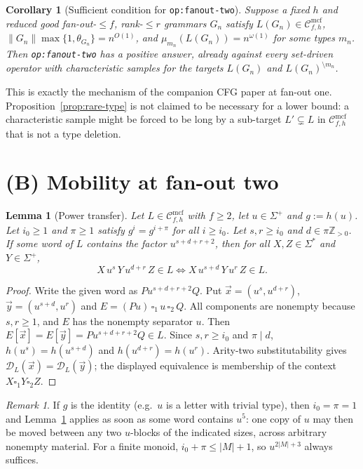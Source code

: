 \documentclass[11pt]{article}
\newtheorem{lemma}[theorem]{Lemma}
\newtheorem{corollary}[theorem]{Corollary}
\theoremstyle{definition}
\theoremstyle{remark}
\newtheorem{remark}[theorem]{Remark}
\newcommand{\Cmcf}[2]{\mathcal{C}^{\mathrm{mcf}}_{#1,#2}}
\newcommand{\D}{\mathcal{D}}
\newcommand{\tuple}[1]{\vec{#1}}
\newcommand{\blank}{\square}
\newcommand{\Z}{\mathbb Z}
\begin{document}
\begin{corollary}[Sufficient condition for \texttt{op:fanout-two}]
Suppose a fixed $h$ and reduced good fan-out-$\le f$, rank-$\le r$ grammars
$G_n$ satisfy $L(G_n)\in\Cmcf{f}{h}$,
$\|G_n\|\max\{1,\theta_{G_n}\}=n^{O(1)}$, and
$\mu_{m_n}(L(G_n))=n^{\omega(1)}$ for some types $m_n$.  Then
\texttt{op:fanout-two} has a positive answer, already against every
set-driven operator with characteristic samples for the targets
$L(G_n)$ and $L(G_n)^{\setminus m_n}$.
\end{corollary}

This is exactly the mechanism of the companion CFG paper at fan-out one.
Proposition~\ref{prop:rare-type} is not claimed to be necessary for a
lower bound: a characteristic sample might be forced to be long by a
sub-target $L'\subsetneq L$ in $\Cmcf{f}{h}$ that is not a type deletion.

\section{(B) Mobility at fan-out two}

\begin{lemma}[Power transfer]\label{lem:power-transfer}
Let $L\in\Cmcf{f}{h}$ with $f\ge2$, let $u\in\Sigma^+$ and $g:=h(u)$.
Let $i_0\ge1$ and $\pi\ge1$ satisfy $g^{i}=g^{i+\pi}$ for all $i\ge i_0$.
Let $s,r\ge i_0$ and $d\in\pi\Z_{>0}$.  If some word of $L$ contains the
factor $u^{s+d+r+2}$, then for all $X,Z\in\Sigma^*$ and $Y\in\Sigma^+$,
\[
 X\,u^{s}\,Y\,u^{d+r}\,Z\in L
 \iff
 X\,u^{s+d}\,Y\,u^{r}\,Z\in L .
\]
\end{lemma}
\begin{proof}
Write the given word as $P u^{s+d+r+2}Q$.  Put
$\tuple x=(u^s,u^{d+r})$, $\tuple y=(u^{s+d},u^r)$ and
$E=(Pu)\,\blank_1\,u\,\blank_2\,Q$.  All components are nonempty because
$s,r\ge1$, and $E$ has the nonempty separator $u$.  Then
$E[\tuple x]=E[\tuple y]=Pu^{s+d+r+2}Q\in L$.  Since $s,r\ge i_0$ and
$\pi\mid d$, $h(u^s)=h(u^{s+d})$ and $h(u^{d+r})=h(u^r)$.  Arity-two
substitutability gives $\D_L(\tuple x)=\D_L(\tuple y)$; the displayed
equivalence is membership of the context $X\blank_1Y\blank_2Z$.
\end{proof}

\begin{remark}
If $g$ is the identity (e.g.\ $u$ is a letter with trivial type), then
$i_0=\pi=1$ and Lemma~\ref{lem:power-transfer} applies as soon as some
word contains $u^5$: one copy of $u$ may then be moved between any two
$u$-blocks of the indicated sizes, across arbitrary nonempty material.
For a finite monoid, $i_0+\pi\le|M|+1$, so $u^{2|M|+3}$ always suffices.
\end{remark}
\end{document}
